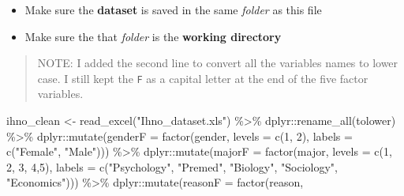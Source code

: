\documentclass[
]{article}
\newenvironment{Shaded}{\begin{snugshade}}{\end{snugshade}}
\newcommand{\AttributeTok}[1]{\textcolor[rgb]{0.77,0.63,0.00}{#1}}
\newcommand{\DecValTok}[1]{\textcolor[rgb]{0.00,0.00,0.81}{#1}}
\newcommand{\FunctionTok}[1]{\textcolor[rgb]{0.00,0.00,0.00}{#1}}
\newcommand{\NormalTok}[1]{#1}
\newcommand{\OtherTok}[1]{\textcolor[rgb]{0.56,0.35,0.01}{#1}}
\newcommand{\SpecialCharTok}[1]{\textcolor[rgb]{0.00,0.00,0.00}{#1}}
\newcommand{\StringTok}[1]{\textcolor[rgb]{0.31,0.60,0.02}{#1}}
\providecommand{\tightlist}{%
  \setlength{\itemsep}{0pt}\setlength{\parskip}{0pt}}
\begin{document}
\begin{itemize}
\tightlist
\item
  Make sure the \textbf{dataset} is saved in the same \emph{folder} as
  this file
\item
  Make sure the that \emph{folder} is the \textbf{working directory}
\end{itemize}

\begin{quote}
NOTE: I added the second line to convert all the variables names to
lower case. I still kept the \texttt{F} as a capital letter at the end
of the five factor variables.
\end{quote}

\begin{Shaded}
\begin{Highlighting}[]
\NormalTok{ihno\_clean }\OtherTok{\textless{}{-}} \FunctionTok{read\_excel}\NormalTok{(}\StringTok{"Ihno\_dataset.xls"}\NormalTok{) }\SpecialCharTok{\%\textgreater{}\%} 
\NormalTok{  dplyr}\SpecialCharTok{::}\FunctionTok{rename\_all}\NormalTok{(tolower) }\SpecialCharTok{\%\textgreater{}\%} 
\NormalTok{  dplyr}\SpecialCharTok{::}\FunctionTok{mutate}\NormalTok{(}\AttributeTok{genderF =} \FunctionTok{factor}\NormalTok{(gender, }
                                 \AttributeTok{levels =} \FunctionTok{c}\NormalTok{(}\DecValTok{1}\NormalTok{, }\DecValTok{2}\NormalTok{),}
                                 \AttributeTok{labels =} \FunctionTok{c}\NormalTok{(}\StringTok{"Female"}\NormalTok{, }
                                            \StringTok{"Male"}\NormalTok{))) }\SpecialCharTok{\%\textgreater{}\%} 
\NormalTok{  dplyr}\SpecialCharTok{::}\FunctionTok{mutate}\NormalTok{(}\AttributeTok{majorF =} \FunctionTok{factor}\NormalTok{(major, }
                                \AttributeTok{levels =} \FunctionTok{c}\NormalTok{(}\DecValTok{1}\NormalTok{, }\DecValTok{2}\NormalTok{, }\DecValTok{3}\NormalTok{, }\DecValTok{4}\NormalTok{,}\DecValTok{5}\NormalTok{),}
                                \AttributeTok{labels =} \FunctionTok{c}\NormalTok{(}\StringTok{"Psychology"}\NormalTok{,}
                                           \StringTok{"Premed"}\NormalTok{,}
                                           \StringTok{"Biology"}\NormalTok{,}
                                           \StringTok{"Sociology"}\NormalTok{,}
                                           \StringTok{"Economics"}\NormalTok{))) }\SpecialCharTok{\%\textgreater{}\%} 
\NormalTok{  dplyr}\SpecialCharTok{::}\FunctionTok{mutate}\NormalTok{(}\AttributeTok{reasonF =} \FunctionTok{factor}\NormalTok{(reason,}

\end{Highlighting}
\end{Shaded}
\end{document}
